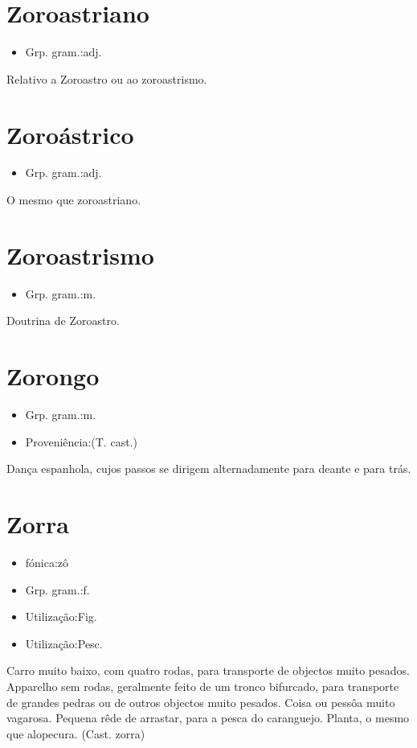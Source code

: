 \section{Zoroastriano}
\begin{itemize}
\item {Grp. gram.:adj.}
\end{itemize}
Relativo a Zoroastro ou ao zoroastrismo.
\section{Zoroástrico}
\begin{itemize}
\item {Grp. gram.:adj.}
\end{itemize}
O mesmo que \textunderscore zoroastriano\textunderscore .
\section{Zoroastrismo}
\begin{itemize}
\item {Grp. gram.:m.}
\end{itemize}
Doutrina de Zoroastro.
\section{Zorongo}
\begin{itemize}
\item {Grp. gram.:m.}
\end{itemize}
\begin{itemize}
\item {Proveniência:(T. cast.)}
\end{itemize}
Dança espanhola, cujos passos se dirigem alternadamente para deante e para trás.
\section{Zorra}
\begin{itemize}
\item {fónica:zô}
\end{itemize}
\begin{itemize}
\item {Grp. gram.:f.}
\end{itemize}
\begin{itemize}
\item {Utilização:Fig.}
\end{itemize}
\begin{itemize}
\item {Utilização:Pesc.}
\end{itemize}
Carro muito baixo, com quatro rodas, para transporte de objectos muito pesados.
Apparelho sem rodas, geralmente feito de um tronco bifurcado, para transporte de grandes pedras ou de outros objectos muito pesados.
Coisa ou pessôa muito vagarosa.
Pequena rêde de arrastar, para a pesca do caranguejo.
Planta, o mesmo que \textunderscore alopecura\textunderscore .
(Cast. \textunderscore zorra\textunderscore )
